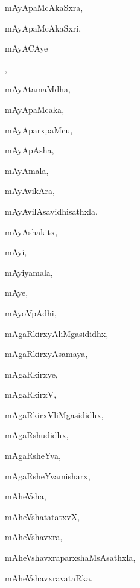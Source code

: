 \begin{multicols}{3}
{\noindent
{mAyApaMcAkaSxra}, \pageref{mAyApaMcAkaSxra}

\noindent
{mAyApaMcAkaSxri}, \pageref{mAyApaMcAkaSxri}

\noindent
{mAyACAye}

\noindent
{}, \pageref{mAyACAyeCAyAmAye}

\noindent
{mAyAtamaMdha}, \pageref{mAyAtamaMdha}

\noindent
{mAyApaMcaka}, \pageref{mAyApaMcaka}

\noindent
{mAyAparxpaMcu}, \pageref{mAyAparxpaMcu}

\noindent
{mAyApAsha}, \pageref{mAyApAsha}

\noindent
{mAyAmala}, \pageref{mAyAmala}

\noindent
{mAyAvikAra}, \pageref{mAyAvikAra}

\noindent
{mAyAvilAsavidhisathxla}, \pageref{mAyAvilAsavidhisathxla}

\noindent
{mAyAshakitx}, \pageref{mAyAshakitx}

\noindent
{mAyi}, \pageref{mAyi}

\noindent
{mAyiyamala}, \pageref{mAyiyamala}

\noindent
{mAye}, \pageref{mAye}

\noindent
{mAyoVpAdhi}, \pageref{mAyoVpAdhi}

\noindent
{mAgaRkirxyAliMgasididhx}, \pageref{mAgaRkirxyAliMgasididhx}

\noindent
{mAgaRkirxyAsamaya}, \pageref{mAgaRkirxyAsamaya}

\noindent
{mAgaRkirxye}, \pageref{mAgaRkirxye}

\noindent
{mAgaRkirxV}, \pageref{mAgaRkirxV}

\noindent
{mAgaRkirxVliMgasididhx}, \pageref{mAgaRkirxVliMgasididhx}

\noindent
{mAgaRshudidhx}, \pageref{mAgaRshudidhx}

\noindent
{mAgaRsheYva}, \pageref{mAgaRsheYva}

\noindent
{mAgaRsheYvamisharx}, \pageref{mAgaRsheYvamisharx}

\noindent
{mAheVsha}, \pageref{mAheVsha}

\noindent
{mAheVshatatatxvX}, \pageref{mAheVshatatatxvX}

\noindent
{mAheVshavxra}, \pageref{mAheVshavxra}

\noindent
{mAheVshavxraparxshaMsAsathxla}, \pageref{mAheVshavxraparxshaMsAsathxla}

\noindent
{mAheVshavxravataRka}, \pageref{mAheVshavxravataRka}

}
\end{multicols}
